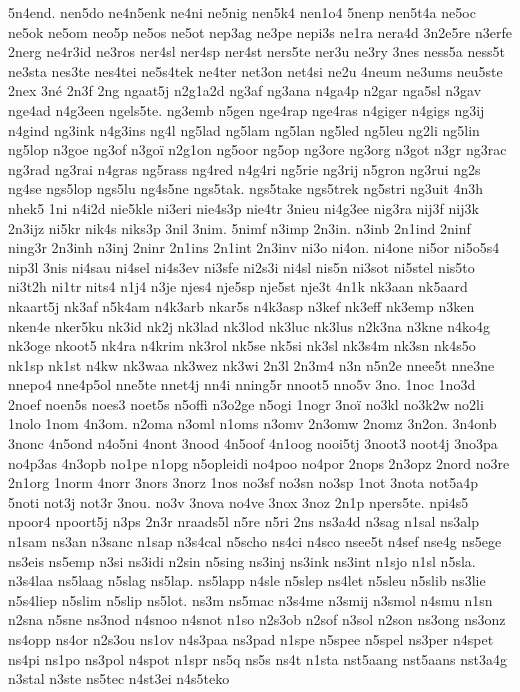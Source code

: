 {5n4end.
nen5do
ne4n5enk
ne4ni
ne5nig
nen5k4
nen1o4
5nenp
nen5t4a
ne5oc
ne5ok
ne5om
neo5p
ne5os
ne5ot
nep3ag
ne3pe
nepi3s
ne1ra
nera4d
3n2e5re
n3erfe
2nerg
ne4r3id
ne3ros
ner4sl
ner4sp
ner4st
ners5te
ner3u
ne3ry
3nes
ness5a
ness5t
ne3sta
nes3te
nes4tei
ne5s4tek
ne4ter
net3on
net4si
ne2u
4neum
ne3ums
neu5ste
2nex
3né
2n3f
2ng
ngaat5j
n2g1a2d
ng3af
ng3ana
n4ga4p
n2gar
nga5sl
n3gav
nge4ad
n4g3een
ngels5te.
ng3emb
n5gen
nge4rap
nge4ras
n4giger
n4gigs
ng3ij
n4gind
ng3ink
n4g3ins
ng4l
ng5lad
ng5lam
ng5lan
ng5led
ng5leu
ng2li
ng5lin
ng5lop
n3goe
ng3of
n3goï
n2g1on
ng5oor
ng5op
ng3ore
ng3org
n3got
n3gr
ng3rac
ng3rad
ng3rai
n4gras
ng5rass
ng4red
n4g4ri
ng5rie
ng3rij
n5gron
ng3rui
ng2s
ng4se
ngs5lop
ngs5lu
ng4s5ne
ngs5tak.
ngs5take
ngs5trek
ng5stri
ng3uit
4n3h
nhek5
1ni
n4i2d
nie5kle
ni3eri
nie4s3p
nie4tr
3nieu
ni4g3ee
nig3ra
nij3f
nij3k
2n3ijz
ni5kr
nik4s
niks3p
3nil
3nim.
5nimf
n3imp
2n3in.
n3inb
2n1ind
2ninf
ning3r
2n3inh
n3inj
2ninr
2n1ins
2n1int
2n3inv
ni3o
ni4on.
ni4one
ni5or
ni5o5s4
nip3l
3nis
ni4sau
ni4sel
ni4s3ev
ni3sfe
ni2s3i
ni4sl
nis5n
ni3sot
ni5stel
nis5to
ni3t2h
ni1tr
nits4
n1j4
n3je
njes4
nje5sp
nje5st
nje3t
4n1k
nk3aan
nk5aard
nkaart5j
nk3af
n5k4am
n4k3arb
nkar5s
n4k3asp
n3kef
nk3eff
nk3emp
n3ken
nken4e
nker5ku
nk3id
nk2j
nk3lad
nk3lod
nk3luc
nk3lus
n2k3na
n3kne
n4ko4g
nk3oge
nkoot5
nk4ra
n4krim
nk3rol
nk5se
nk5si
nk3sl
nk3s4m
nk3sn
nk4s5o
nk1sp
nk1st
n4kw
nk3waa
nk3wez
nk3wi
2n3l
2n3m4
n3n
n5n2e
nnee5t
nne3ne
nnepo4
nne4p5ol
nne5te
nnet4j
nn4i
nning5r
nnoot5
nno5v
3no.
1noc
1no3d
2noef
noen5s
noes3
noet5s
n5offi
n3o2ge
n5ogi
1nogr
3noï
no3kl
no3k2w
no2li
1nolo
1nom
4n3om.
n2oma
n3oml
n1oms
n3omv
2n3omw
2nomz
3n2on.
3n4onb
3nonc
4n5ond
n4o5ni
4nont
3nood
4n5oof
4n1oog
nooi5tj
3noot3
noot4j
3no3pa
no4p3as
4n3opb
no1pe
n1opg
n5opleidi
no4poo
no4por
2nops
2n3opz
2nord
no3re
2n1org
1norm
4norr
3nors
3norz
1nos
no3sf
no3sn
no3sp
1not
3nota
not5a4p
5noti
not3j
not3r
3nou.
no3v
3nova
no4ve
3nox
3noz
2n1p
npers5te.
npi4s5
npoor4
npoort5j
n3ps
2n3r
nraads5l
n5re
n5ri
2ns
ns3a4d
n3sag
n1sal
ns3alp
n1sam
ns3an
n3sanc
n1sap
n3s4cal
n5scho
ns4ci
n4sco
nsee5t
n4sef
nse4g
ns5ege
ns3eis
ns5emp
n3si
ns3idi
n2sin
n5sing
ns3inj
ns3ink
ns3int
n1sjo
n1sl
n5sla.
n3s4laa
ns5laag
n5slag
ns5lap.
ns5lapp
n4sle
n5slep
ns4let
n5sleu
n5slib
ns3lie
n5s4liep
n5slim
n5slip
ns5lot.
ns3m
ns5mac
n3s4me
n3smij
n3smol
n4smu
n1sn
n2sna
n5sne
ns3nod
n4snoo
n4snot
n1so
n2s3ob
n2sof
n3sol
n2son
ns3ong
ns3onz
ns4opp
ns4or
n2s3ou
ns1ov
n4s3paa
ns3pad
n1spe
n5spee
n5spel
ns3per
n4spet
ns4pi
ns1po
ns3pol
n4spot
n1spr
ns5q
ns5s
ns4t
n1sta
nst5aang
nst5aans
nst3a4g
n3stal
n3ste
ns5tec
n4st3ei
n4s5teko
}
